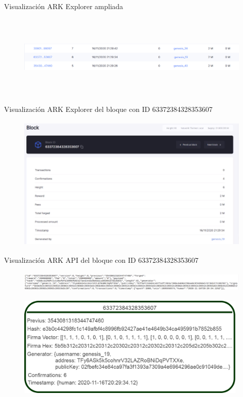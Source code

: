 \documentclass[10pt,aspectratio=169,]{beamer}
\begin{document}
\begin{frame}[c]{Visualización ARK Explorer ampliada}
	\begin{figure}
		\centering
		\includegraphics[height=4cm]{explorer_3.png}
	\end{figure}
\end{frame}

\begin{frame}[c]{Visualización ARK Explorer del bloque con ID 63372384328353607}
	\begin{figure}
		\centering
		\includegraphics[height=6.5cm]{explorer_4.png}
	\end{figure}
\end{frame}

\begin{frame}[c]{Visualización ARK API del bloque con ID 63372384328353607}
	\begin{figure}
		\centering
		\includegraphics[height=1cm]{explorer_5.png}
	\end{figure}
	\begin{figure}
		\centering
		\includegraphics[height=4.8cm]{bloque_hash.png}
	\end{figure}
\end{frame}
\end{document}
